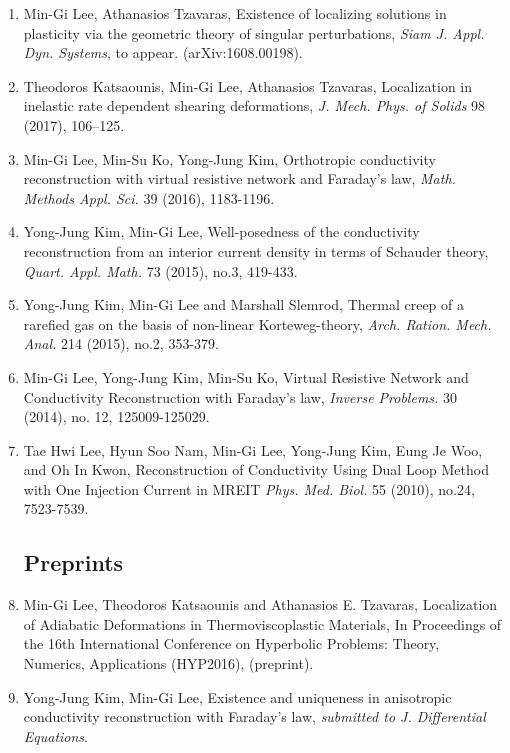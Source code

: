 \documentclass[a4paper,11pt]{article}
\begin{document}
\begin{enumerate}
\item Min-Gi Lee, Athanasios Tzavaras, Existence of localizing solutions in plasticity via the geometric theory of singular perturbations, {\it Siam J. Appl. Dyn. Systems}, to appear. (arXiv:1608.00198).
\item Theodoros Katsaounis, Min-Gi Lee, Athanasios Tzavaras, Localization in inelastic rate dependent shearing deformations, {\it J. Mech. Phys. of Solids} 98 (2017), 106--125.
\item Min-Gi Lee, Min-Su Ko, Yong-Jung Kim, Orthotropic conductivity reconstruction with virtual resistive network and Faraday's law, {\it Math. Methods Appl. Sci.} 39 (2016), 1183-1196.%
\item Yong-Jung Kim, Min-Gi Lee, Well-posedness of the conductivity reconstruction from an interior current density in terms of Schauder theory, {\it Quart. Appl. Math.} 73 (2015), no.3, 419-433.
%
\item Yong-Jung Kim, Min-Gi Lee and Marshall Slemrod, Thermal creep of a rarefied gas on the basis of non-linear Korteweg-theory, {\it Arch. Ration. Mech. Anal.} 214 (2015), no.2, 353-379.
\item Min-Gi Lee, Yong-Jung Kim, Min-Su Ko, Virtual Resistive Network and Conductivity Reconstruction with Faraday's law, {\it Inverse Problems.} 30 (2014), no. 12, 125009-125029.
\item Tae Hwi Lee, Hyun Soo Nam, Min-Gi Lee, Yong-Jung Kim, Eung Je Woo, and Oh In Kwon, Reconstruction of Conductivity Using Dual Loop Method with One Injection Current in MREIT {\it Phys. Med. Biol.} 55 (2010), no.24, 7523-7539.
\subsection*{Preprints}
\item Min-Gi Lee, Theodoros Katsaounis and Athanasios E. Tzavaras, Localization of Adiabatic Deformations in Thermoviscoplastic Materials, In Proceedings of the 16th International Conference on Hyperbolic Problems: Theory, Numerics, Applications (HYP2016), (preprint).
\item Yong-Jung Kim, Min-Gi Lee, Existence and uniqueness in anisotropic conductivity reconstruction with Faraday's law, {\it submitted to J. Differential Equations}.


\end{enumerate}
\end{document}
